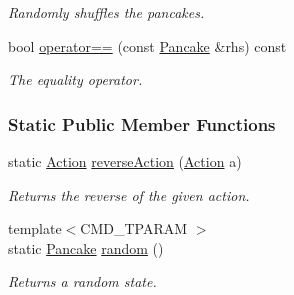 \begin{DoxyCompactItemize}
\begin{DoxyCompactList}\small\item\em Randomly shuffles the pancakes. \end{DoxyCompactList}\item 
bool \hyperlink{structslb_1_1ext_1_1domain_1_1pancake_1_1Pancake_aa9ccc44ea53d2ec002dca3c2a1889697}{operator==} (const \hyperlink{structslb_1_1ext_1_1domain_1_1pancake_1_1Pancake}{Pancake} \&rhs) const 
\begin{DoxyCompactList}\small\item\em The equality operator. \end{DoxyCompactList}\end{DoxyCompactItemize}
\subsubsection*{Static Public Member Functions}
\begin{DoxyCompactItemize}
\item 
static \hyperlink{structslb_1_1ext_1_1domain_1_1pancake_1_1Pancake_aee972b60eec5485f6f53aabf5bcb4498}{Action} \hyperlink{structslb_1_1ext_1_1domain_1_1pancake_1_1Pancake_af887ef0b06e8ccaf9afab4c0eb45139f}{reverse\+Action} (\hyperlink{structslb_1_1ext_1_1domain_1_1pancake_1_1Pancake_aee972b60eec5485f6f53aabf5bcb4498}{Action} a)
\begin{DoxyCompactList}\small\item\em Returns the reverse of the given action. \end{DoxyCompactList}\item 
{\footnotesize template$<$C\+M\+D\+\_\+\+T\+P\+A\+R\+AM $>$ }\\static \hyperlink{structslb_1_1ext_1_1domain_1_1pancake_1_1Pancake}{Pancake} \hyperlink{structslb_1_1ext_1_1domain_1_1pancake_1_1Pancake_a0ba7de4f2098c5df36ce0a551305bcbf}{random} ()
\begin{DoxyCompactList}\small\item\em Returns a random state. \end{DoxyCompactList}\end{DoxyCompactItemize}
